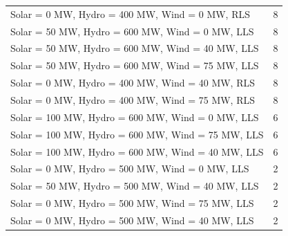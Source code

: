 \documentclass[10pt]{report}
\begin{document}
\begin{table}[H]
{\begin{tabular}{lr}
Solar = 0 MW, Hydro = 400 MW, Wind = 0 MW, RLS & 8 \\
Solar = 50 MW, Hydro = 600 MW, Wind = 0 MW, LLS & 8 \\
Solar = 50 MW, Hydro = 600 MW, Wind = 40 MW, LLS & 8 \\
Solar = 50 MW, Hydro = 600 MW, Wind = 75 MW, LLS & 8 \\
Solar = 0 MW, Hydro = 400 MW, Wind = 40 MW, RLS & 8 \\
Solar = 0 MW, Hydro = 400 MW, Wind = 75 MW, RLS & 8 \\
Solar = 100 MW, Hydro = 600 MW, Wind = 0 MW, LLS & 6 \\
Solar = 100 MW, Hydro = 600 MW, Wind = 75 MW, LLS & 6 \\
Solar = 100 MW, Hydro = 600 MW, Wind = 40 MW, LLS & 6 \\
Solar = 0 MW, Hydro = 500 MW, Wind = 0 MW, LLS & 2 \\
Solar = 50 MW, Hydro = 500 MW, Wind = 40 MW, LLS & 2 \\
Solar = 0 MW, Hydro = 500 MW, Wind = 75 MW, LLS & 2 \\
Solar = 0 MW, Hydro = 500 MW, Wind = 40 MW, LLS & 2 \\
\bottomrule
\end{tabular}}
\end{table}
\end{document}

